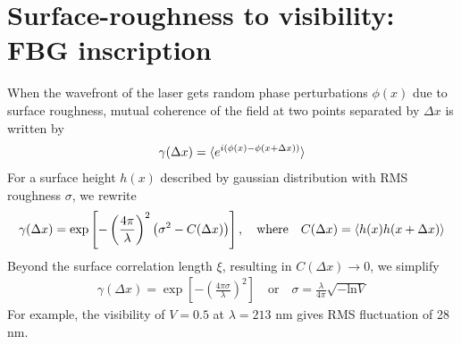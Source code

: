 \documentclass[aps,pra, onecolumn,superscriptaddress,nopacs,floatfix, showkeys, notitlepage]{revtex4-1}
\begin{document}
\section{Surface-roughness to visibility: FBG inscription}
When the wavefront of the laser gets random phase perturbations $\phi(x)$ due to surface roughness, mutual coherence of the field at two points separated by $\Delta x$ is written by \cite{Leger1975}
\begin{eqnarray}
    \gamma(\Delta x)=\braket{e^{i(\phi(x)-\phi(x+\Delta x))}}
\end{eqnarray}
For a surface height $h(x)$ described by gaussian distribution with RMS roughness $\sigma$, we rewrite
\begin{eqnarray}
    \gamma(\Delta x)=\exp\left[-\left(\frac{4\pi}{\lambda}\right)^2\left(\sigma^2-C(\Delta x)\right)\right],\quad \mathrm{where}\quad C(\Delta x)=\braket{h(x)h(x+\Delta x)}
\end{eqnarray}
Beyond the surface correlation length $\xi$, resulting in $C(\Delta x)\rightarrow 0$, we simplify 
\begin{eqnarray}
    \gamma(\Delta x)=\exp\left[-\left(\frac{4\pi\sigma}{\lambda}\right)^2\right]\quad \mathrm{or}\quad \sigma = \frac{\lambda}{4\pi}\sqrt{-\mathrm{ln}V}
\end{eqnarray}
For example, the visibility of $V=0.5$ at $\lambda=213$ nm gives RMS fluctuation of 28 nm.

 
\end{document}
